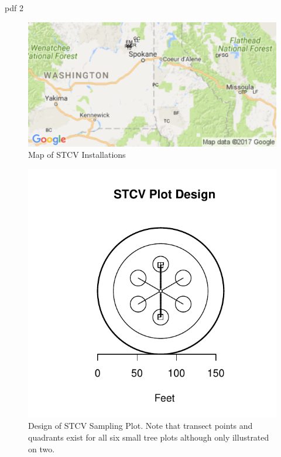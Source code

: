 \documentclass[11pt, letterpaper, fleqn]{article}
\begin{document}
\begin{Schunk}
\begin{Soutput}
pdf 
  2 
\end{Soutput}
\end{Schunk}

\begin{figure}[ht]
\begin{center}
    \includegraphics[width=.8\textwidth]{inst_map.png}
    \caption{Map of STCV Installations}
    \label{fig:map}
\end{center}
\end{figure}


\begin{figure}
\begin{center}
\includegraphics{Thesis_doc-sampleplot}
\end{center}
\caption{Design of STCV Sampling Plot. Note that transect points and quadrants exist for all six small tree plots although only illustrated on two.}
\end{figure}
\end{document}
